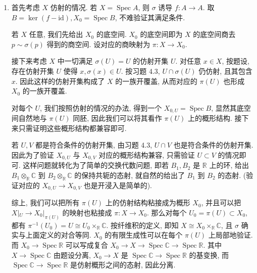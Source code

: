 \documentclass{article}
\theoremstyle{exercise}
\theoremstyle{plain}
\theoremstyle{remark}
\newenvironment{proofc}{\proof}{\endproof}
\def\R{\mathbb{R}}
\def\C{\mathbb{C}}
\def\id{\mathrm{id}}
\def\Spec{\operatorname{Spec}}
\begin{document}
\begin{proofc}
  \begin{enumerate}[label=(\alph*)]
    \item 首先考虑 $X$ 仿射的情况. 若 $X = \Spec A$, 则 $\sigma$ 诱导 $f \colon A \to A$.
          取 $B = \ker (f - \id), X_0 = \Spec B$, 不难验证其满足条件.

          若 $X$ 任意, 我们先给出 $X_0$ 的底空间.
          $X_0$ 的底空间即为 $X$ 的底空间商去 $p \sim \sigma(p)$ 得到的商空间.
          设对应的商映射为 $\pi \colon X \to X_0$.

          接下来考虑 $X$ 中一切满足 $\sigma(U) = U$ 的仿射开集 $U$.
          对任意 $x \in X$, 按题设, 存在仿射开集 $U$ 使得 $x, \sigma(x) \in U$.
          按习题 4.3, $U \cap \sigma(U)$ 仍仿射, 且其包含 $x$.
          因此这样的仿射开集构成了 $X$ 的一族开覆盖,
          从而对应的 $\pi(U)$ 也形成 $X_0$ 的一族开覆盖.

          对每个 $U$, 我们按照仿射的情况的办法, 得到一个 $X_{0, U} = \Spec B$,
          显然其底空间自然地与 $\pi(U)$ 同胚, 因此我们可以将其看作 $\pi(U)$ 上的概形结构.
          接下来只需证明这些概形结构都兼容即可.

          若 $U, V$ 都是符合条件的仿射开集, 由习题 4.3, $U \cap V$ 也是符合条件的仿射开集.
          因此为了验证 $X_{0, U}$ 与 $X_{0, V}$ 对应的概形结构兼容,
          只需验证 $U \subset V$ 的情况即可.
          这样问题就转化为了简单的交换代数问题,
          即若 $B_1, B_2$ 是 $\R$ 上的环,
          给出 $B_1 \otimes_{\R} \C$ 到 $B_2 \otimes_{\R} \C$ 的保持共轭的态射,
          就自然的给出了 $B_1$ 到 $B_2$ 的态射.
          (验证对应的 $X_{0, U} \to X_{0, V}$ 也是开浸入是简单的).

          综上, 我们可以把所有 $\pi(U)$ 上的仿射结构粘接成为概形 $X_0$,
          并且可以把 $X|_U \to X_0|_{\pi(U)}$ 的映射也粘接成 $\pi \colon X \to X_0$.
          那么对每个 $U_0 = \pi(U) \subset X_0$, 都有 $\pi^{-1}(U_0) = U \cong U_0 \times_{\R} \C$.
          按纤维积的定义, 即知 $X \cong X_0 \times_{\R} \C$,
          且 $\sigma$ 确实与上面定义的对合等同.
          $X_0$ 的有限生成性可以在每个 $\pi(U)$ 上局部地验证.
          而 $X_0 \to \Spec \R$ 可以写成复合 $X_0 \to X \to \Spec \C \to \Spec \R$.
          其中 $X \to \Spec \C$ 由题设分离, $X_0 \to X$ 是 $\Spec \C \to \Spec \R$ 的基变换,
          而 $\Spec \C \to \Spec \R$ 是仿射概形之间的态射, 因此分离.


\end{enumerate}
\end{proofc}
\end{document}
